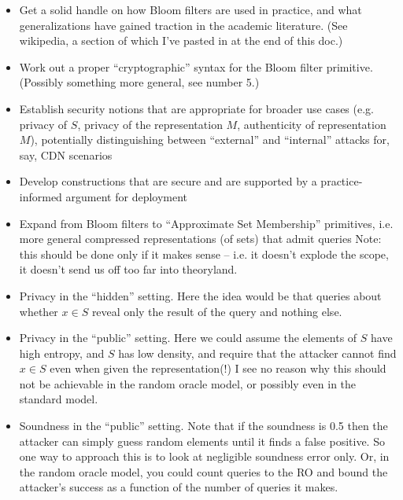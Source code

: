 \begin{itemize}
\item Get a solid handle on how Bloom filters are used in practice, and what generalizations have gained traction in the academic literature. (See wikipedia, a section of which I’ve pasted in at the end of this doc.)
\item Work out a proper “cryptographic” syntax for the Bloom filter primitive.  (Possibly something more general, see number 5.)
\item Establish security notions that are appropriate for broader use cases (e.g. privacy of $S$, privacy of the representation $M$, authenticity of representation $M$), potentially distinguishing between “external” and “internal” attacks for, say, CDN scenarios
\item Develop constructions that are secure and are supported by a practice-informed argument for deployment
\item Expand from Bloom filters to “Approximate Set Membership” primitives, i.e. more general compressed representations (of sets) that admit queries  Note: this should be done only if it makes sense -- i.e. it doesn’t explode the scope, it doesn’t send us off too far into theoryland.
\end{itemize}


\begin{itemize}
\item Privacy in the “hidden” setting. Here the idea would be that queries about whether $x \in S$ reveal only the result of the query and nothing else. 

\item Privacy in the “public” setting. Here we could assume the elements of $S$ have high entropy, and $S$ has low density, and require that the attacker cannot find $x \in S$ even when given the representation(!) I see no reason why this should not be achievable in the random oracle model, or possibly even in the standard model.

\item Soundness in the “public” setting. Note that if the soundness is 0.5 then the attacker can simply guess random elements until it finds a false positive. So one way to approach this is to look at negligible soundness error only. Or, in the random oracle model, you could count queries to the RO and bound the attacker’s success as a function of the number of queries it makes.
\end{itemize}

